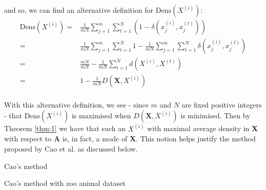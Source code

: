and so, we can find an alternative definition for \(\text{Dens}(X^{(i)})\):
\begin{equation}
\begin{aligned}
    \text{Dens}(X^{(i)}) = {} & {} \frac{1}{mN} \sum_{j=1}^m \sum_{t=1}^N 
                         (1 - \delta(x_j^{(i)}, x_j^{(t)}))
    \\
			             = {} & {} \frac{1}{mN} \sum_{j=1}^m \sum_{t=1}^N 1 - 
                         \frac{1}{mN} \sum_{j=1}^m \sum_{t=1}^N 
                         \delta(x_j^{(i)}, x_j^{(t)})
    \\
                         = {} & {} \frac{mN}{mN} - \frac{1}{mN} \sum_{t=1}^N 
                         d(X^{(i)}, X^{(t)})
    \\
			             = {} & {} 1 - \frac{1}{mN} D(\textbf{X}, X^{(i)})
\end{aligned}
\end{equation}\\

With this alternative definition, we see - since \(m\) and \(N\) are fixed 
positive integers - that \(\text{Dens}(X^{(i)})\) is maximised when 
\(D(\textbf{X}, X^{(i)})\) is minimised. Then by Theorem \ref{thm:1} we have
that such an \(X^{(i)}\) with maximal average density in \textbf{X} with respect
to \textbf{A} is, in fact, a mode of \textbf{X}. This notion helps justify the 
method proposed by Cao et al. as discussed below.\\

\begin{algorithm}[H]
\caption{Cao's method}\label{alg:cao}
	\begin{algorithmic}[0]
        \State{\(\bar{\mu} \gets \emptyset\)}
		\EndFor
		\EndWhile
	\end{algorithmic}
\end{algorithm}

\begin{example}\label{ex:cao}
    Cao's method with zoo animal dataset
\end{example}

